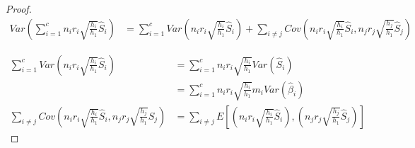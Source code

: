 \documentclass{article}
\begin{document}
\begin{proof}

$$
\begin{aligned}
Var(\sum^c_{i=1} n_i r_i \sqrt{\frac{h_i}{h_1}} \hat{S}_i) &= \sum^c_{i=1} Var \left( n_i r_i \sqrt{\frac{h_i}{h_1}} \hat{S}_i \right) + \sum_{i \neq j} Cov \left( n_i r_i \sqrt{\frac{h_i}{h_1}} \hat{S}_i, n_j r_j \sqrt{\frac{h_j}{h_1}} \hat{S}_j \right) 
\end{aligned}
$$

$$
\begin{aligned}
\sum^c_{i=1} Var \left( n_i r_i \sqrt{\frac{h_i}{h_1}} \hat{S}_i \right) &= \sum^c_{i=1} n_i r_i \sqrt{\frac{h_i}{h_1}}  Var(\hat{S}_i) \\
&= \sum^c_{i=1} n_i r_i \sqrt{\frac{h_i}{h_1}} m_i Var(\hat{\beta}_i) \\
\sum_{i \neq j} Cov \left(  n_i r_i \sqrt{\frac{h_i}{h_1}} \hat{S}_i,  n_j r_j \sqrt{\frac{h_j}{h_1}} \hat{S}_j \right) &= \sum_{i \neq j} E \left[ \left( n_i r_i \sqrt{\frac{h_i}{h_1}} \hat{S}_i \right), \left( n_j r_j \sqrt{\frac{h_j}{h_1}} \hat{S}_j  \right)  \right]
\end{aligned}
$$


\end{proof}
\end{document}
